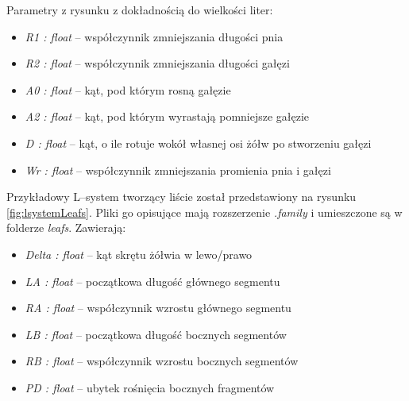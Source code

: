 \documentclass[inz,shortabstract]{iithesis}
\begin{document}
        Parametry z rysunku z dokładnością do wielkości liter:
        \begin{itemize}
            \item \textit{R1 : float} -- współczynnik zmniejszania długości pnia
            \item \textit{R2 : float} -- współczynnik zmniejszania długości gałęzi
            \item \textit{A0 : float} -- kąt, pod którym rosną gałęzie
            \item \textit{A2 : float} -- kąt, pod którym wyrastają pomniejsze gałęzie
            \item \textit{D : float} -- kąt, o ile rotuje wokół własnej osi żółw po stworzeniu gałęzi
            \item \textit{Wr : float} -- współczynnik zmniejszania promienia pnia i gałęzi
        \end{itemize}    
        
        Przykładowy L--system tworzący liście został przedstawiony na rysunku \ref{fig:lsystemLeafs}. Pliki go opisujące mają rozszerzenie \textit{.family} i umieszczone są w folderze \textit{leafs}. Zawierają:
        \begin{itemize}
            \item \textit{Delta : float} -- kąt skrętu żółwia w lewo/prawo
            \item \textit{LA : float} -- początkowa długość głównego segmentu
            \item \textit{RA : float} -- współczynnik wzrostu głównego segmentu
            \item \textit{LB : float} -- początkowa długość bocznych segmentów
            \item \textit{RB : float} -- współczynnik wzrostu bocznych segmentów
            \item \textit{PD : float} -- ubytek rośnięcia bocznych fragmentów
        \end{itemize}    
        
\end{document}
